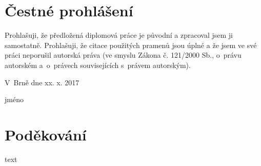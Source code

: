 \documentclass[12pt,oneside,a4paper]{report}
\renewcommand{\baselinestretch}{1.5}
\newcommand{\blank}[1]{\hspace*{#1}}
\begin{document}
\newpage
\hbox{}
\vfill

\section*{Čestné prohlášení}
Prohlašuji, že předložená diplomová práce je původní a zpracoval jsem ji samostatně. Prohlašuji, že citace použitých pramenů jsou úplné a že jsem ve své práci neporušil autorská práva (ve smyslu Zákona č. 121/2000 Sb., o~právu autorském a~o~právech souvisejících s~právem autorským).
\\
\par V~Brně dne xx. x. 2017 %
\hfill\dotuline{\blank{5cm}}\hskip2cm
\par\hfill jméno \hskip5cm\blank{-4cm}
\vskip1cm

\newpage
\hbox{}
\vfill

\section*{Poděkování}
text
\vskip1cm

\renewcommand{\baselinestretch}{1}
\tableofcontents


\renewcommand{\baselinestretch}{1.5}



\pagestyle{plain}     %





\newpage

\listoffigures
{}
\newpage
\listoftables
{}
\newpage
{}
\newpage
\listofequationcaps
{}
\newpage
\listofgraphs
{}
\glsaddall
\printglossary[title=Seznam zkratek, nonumberlist]

\end{document}
